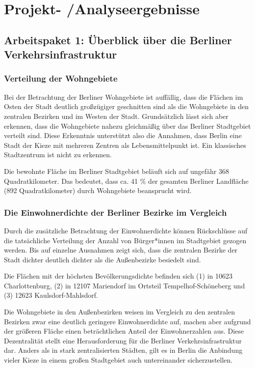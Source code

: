 \newpage
\section{Projekt- /Analyseergebnisse} \label{ergebnisse}

\subsection{Arbeitspaket 1: Überblick über die Berliner Verkehrsinfrastruktur}

\subsubsection{Verteilung der Wohngebiete}

Bei der Betrachtung der Berliner Wohngebiete ist auffällig, dass die Flächen im Osten der Stadt deutlich großzügiger geschnitten sind als die Wohngebiete in den zentralen Bezirken und im Westen der Stadt. Grundsätzlich lässt sich aber erkennen, dass die Wohngebiete nahezu gleichmäßig über das Berliner Stadtgebiet verteilt sind. Diese Erkenntnis unterstützt also die Annahmen, dass Berlin eine Stadt der Kieze mit mehreren Zentren als Lebensmittelpunkt ist. Ein klassisches Stadtzentrum ist nicht zu erkennen.

Die bewohnte Fläche im Berliner Stadtgebiet beläuft sich auf ungefähr 368 Quadratkilometer. Das bedeutet, dass ca. 41 \% der gesamten Berliner Landfläche (892 Quadratkilometer) durch Wohngebiete beansprucht wird.

\subsubsection{Die Einwohnerdichte der Berliner Bezirke im Vergleich}

Durch die zusätzliche Betrachtung der Einwohnerdichte können Rückschlüsse auf die tatsächliche Verteilung der Anzahl von Bürger*innen im Stadtgebiet gezogen werden. Bis auf einzelne Ausnahmen zeigt sich, dass die zentralen Bezirke der Stadt dichter deutlich dichter als die Außenbezirke besiedelt sind.

Die Flächen mit der höchsten Bevölkerungsdichte befinden sich (1) in 10623 Charlottenburg, (2) in 12107 Mariendorf im Ortsteil Tempelhof-Schöneberg und (3) 12623 Kaulsdorf-Mahlsdorf.


Die Wohngebiete in den Außenbezirken weisen im Vergleich zu den zentralen Bezirken zwar eine deutlich geringere Einwohnerdichte auf, machen aber aufgrund der größeren Fläche einen beträchtlichen Anteil der Einwohnerzahlen aus. Diese Dezentralität stellt eine Herausforderung für die Berliner Verkehrsinfrastruktur dar. Anders als in stark zentralisierten Städten, gilt es in Berlin die Anbindung vieler Kieze in einem großen Stadtgebiet auch untereinander sicherzustellen.



